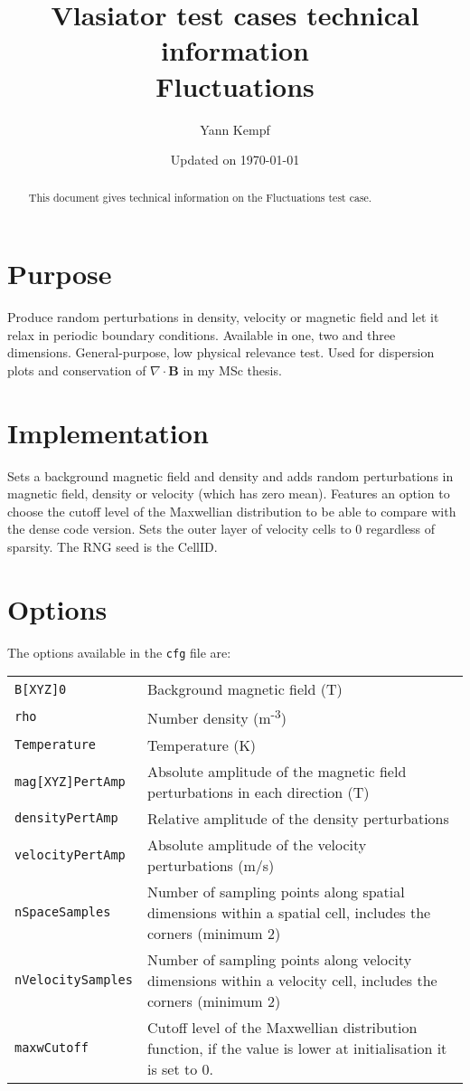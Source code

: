 \documentclass[a4paper,10pt]{scrartcl}
\title{
\Huge{Vlasiator test cases technical information} \\
\LARGE{Fluctuations}
}
\author{Yann Kempf}
\date{Updated on \today}
\begin{document}
\maketitle

\begin{abstract}
   This document gives technical information on the Fluctuations test case.
\end{abstract}

\section{Purpose}
Produce random perturbations in density, velocity or magnetic field and let it relax in periodic boundary conditions. Available in one, two and three dimensions. General-purpose, low physical relevance test. Used for dispersion plots and conservation of $\nabla\cdot\mathbf{B}$ in my MSc thesis.


\section{Implementation}
Sets a background magnetic field and density and adds random perturbations in magnetic field, density or velocity (which has zero mean). Features an option to choose the cutoff level of the Maxwellian distribution to be able to compare with the dense code version. Sets the outer layer of velocity cells to 0 regardless of sparsity. The RNG seed is the CellID.

\section{Options}
The options available in the \verb=cfg= file are:

\begin{tabularx}{\textwidth}{lX}
   \verb=B[XYZ]0= & Background magnetic field (T) \\
   \verb=rho= & Number density (m\textsuperscript{-3}) \\
   \verb=Temperature= & Temperature (K) \\
   \verb=mag[XYZ]PertAmp= & Absolute amplitude of the magnetic field perturbations in each direction (T) \\
   \verb=densityPertAmp= & Relative amplitude of the density perturbations \\
   \verb=velocityPertAmp= & Absolute amplitude of the velocity perturbations (m/s) \\
   \verb=nSpaceSamples= & Number of sampling points along spatial dimensions within a spatial cell, includes the corners (minimum 2) \\
   \verb=nVelocitySamples= & Number of sampling points along velocity dimensions within a velocity cell, includes the corners (minimum 2) \\
   \verb=maxwCutoff= & Cutoff level of the Maxwellian distribution function, if the value is lower at initialisation it is set to 0.
\end{tabularx}
\end{document}
